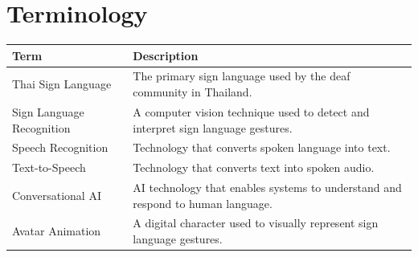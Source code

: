 \section{Terminology}
\label{section:terminology}
\begin{table}[h]
\centering
\renewcommand{\arraystretch}{1.5} %
\begin{tabular}{|l|p{10cm}|}
\hline
\textbf{Term} & \textbf{Description} \\ \hline
Thai Sign Language  & The primary sign language used by the deaf community in Thailand. \\ \hline
Sign Language Recognition & A computer vision technique used to detect and interpret sign language gestures. \\ \hline
Speech Recognition & Technology that converts spoken language into text. \\ \hline
Text-to-Speech  & Technology that converts text into spoken audio. \\ \hline
Conversational AI & AI technology that enables systems to understand and respond to human language. \\ \hline
Avatar Animation & A digital character used to visually represent sign language gestures. \\ \hline
\end{tabular}
\end{table}
